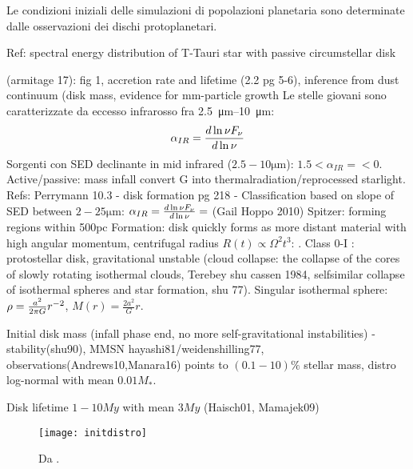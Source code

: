 \begin{workout}
Le condizioni iniziali delle simulazioni di popolazioni planetaria sono determinate dalle osservazioni dei dischi protoplanetari.

\begin{workout}
Ref: spectral energy distribution of T-Tauri star with passive circumstellar disk
\end{workout}

\begin{workout}
(armitage 17): fig 1, accretion rate and lifetime (2.2 pg 5-6), inference from dust continuum (disk mass, evidence for mm-particle growth
Le stelle giovani sono caratterizzate da eccesso infrarosso fra \SIrange{2.5}{10}{\micro\meter}:
\begin{equation}
\alpha_{IR}=\frac{d \ln{\nu F_{\nu}}}{d \ln{\nu}}
\end{equation}
Sorgenti con SED declinante in mid infrared ($2.5-10\si{\micro\meter}$): $1.5<\alpha_{IR}=<0$. Active/passive: mass infall convert G into thermalradiation/reprocessed starlight.
Refs: Perrymann 10.3 - disk formation pg 218 - 
Classification based on slope of SED between $2-25\si{\micro\meter}$: $\alpha_{IR}=\frac{d \ln{\nu F_{\nu}}}{d \ln{\nu}}=$ (Gail Hoppo 2010)
Spitzer: forming regions within 500pc
Formation: disk quickly forms as more distant material with high angular momentum, centrifugal radius $R(t)\propto\Omega^2 t^3$: . Class 0-I : protostellar disk, gravitational unstable (cloud collapse: the collapse of the cores of slowly rotating isothermal clouds, Terebey shu cassen 1984, selfsimilar collapse of isothermal spheres and star formation, shu 77). Singular isothermal sphere: $\rho=\frac{a^2}{2\pi G}r^{-2}$, $M(r)=\frac{2a^2}{G}r$.
\end{workout}

\begin{workout}

Initial disk mass
(infall phase end, no more self-gravitational instabilities) - stability(shu90), MMSN hayashi81/weidenshilling77, observations(Andrews10,Manara16) points to $(0.1-10)\%$ stellar mass, distro log-normal with mean $0.01M_*$.

{Disk lifetime}
$1-10My$ with mean $3My$ (Haisch01, Mamajek09)

\begin{figure}[!ht]\texttt{[image: initdistro]}\label{fig:initdistro}\caption{Da \cite{mordasini2018planetary}.}\end{figure}


\end{workout}
\end{workout}
